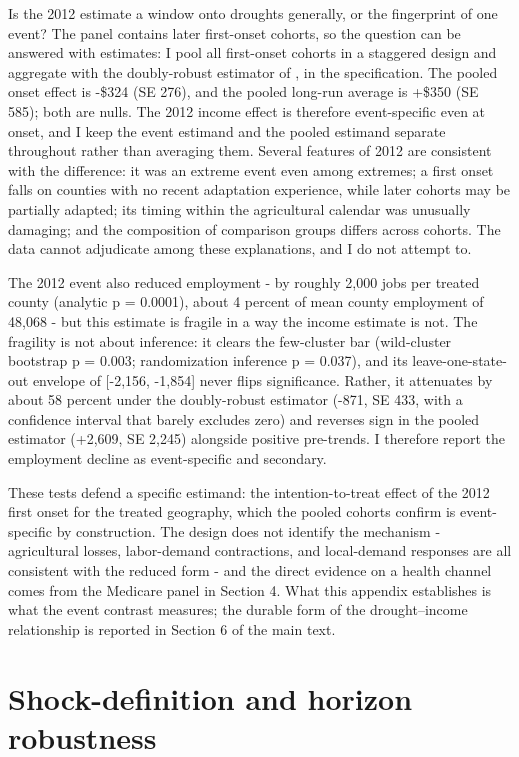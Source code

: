 \documentclass[a4paper,11pt]{article}
\begin{document}
Is the 2012 estimate a window onto droughts generally, or the fingerprint of one event? The panel contains later first-onset cohorts, so the question can be answered with estimates: I pool all first-onset cohorts in a staggered design and aggregate with the doubly-robust estimator of \citet{callaway2021did}, in the \citet{santanna2020drdid} specification. The pooled onset effect is -\$324 (SE 276), and the pooled long-run average is +\$350 (SE 585); both are nulls. The 2012 income effect is therefore event-specific even at onset, and I keep the event estimand and the pooled estimand separate throughout rather than averaging them. Several features of 2012 are consistent with the difference: it was an extreme event even among extremes; a first onset falls on counties with no recent adaptation experience, while later cohorts may be partially adapted; its timing within the agricultural calendar was unusually damaging; and the composition of comparison groups differs across cohorts. The data cannot adjudicate among these explanations, and I do not attempt to.

The 2012 event also reduced employment - by roughly 2,000 jobs per treated county (analytic p = 0.0001), about 4 percent of mean county employment of 48,068 - but this estimate is fragile in a way the income estimate is not. The fragility is not about inference: it clears the few-cluster bar (wild-cluster bootstrap p = 0.003; randomization inference p = 0.037), and its leave-one-state-out envelope of [-2,156, -1,854] never flips significance. Rather, it attenuates by about 58 percent under the doubly-robust estimator (-871, SE 433, with a confidence interval that barely excludes zero) and reverses sign in the pooled estimator (+2,609, SE 2,245) alongside positive pre-trends. I therefore report the employment decline as event-specific and secondary.

These tests defend a specific estimand: the intention-to-treat effect of the 2012 first onset for the treated geography, which the pooled cohorts confirm is event-specific by construction. The design does not identify the mechanism - agricultural losses, labor-demand contractions, and local-demand responses are all consistent with the reduced form - and the direct evidence on a health channel comes from the Medicare panel in Section 4. What this appendix establishes is what the event contrast measures; the durable form of the drought--income relationship is reported in Section 6 of the main text.

\FloatBarrier
\section{Shock-definition and horizon robustness}
\end{document}
